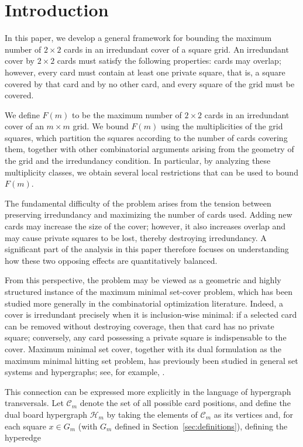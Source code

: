 \documentclass[11pt]{article}
\begin{document}
	\section{Introduction}\label{sec:Intro}
	
	In this paper, we develop a general framework for bounding the maximum number of
	\(2\times2\) cards in an irredundant cover of a square grid. An irredundant cover
	by \(2\times2\) cards must satisfy the following properties: cards may overlap;
	however, every card must contain at least one private square, that is, a square
	covered by that card and by no other card, and every square of the grid must be
	covered.
	
	We define \(F(m)\) to be the maximum number of \(2\times2\) cards in an
	irredundant cover of an \(m\times m\) grid. We bound \(F(m)\) using the
	multiplicities of the grid squares, which partition the squares according to
	the number of cards covering them, together with other combinatorial arguments
	arising from the geometry of the grid and the irredundancy condition.
	In particular, by analyzing these multiplicity classes, we obtain several local
	restrictions that can be used to bound \(F(m)\).
	
	The fundamental difficulty of the problem arises from the tension between
	preserving irredundancy and maximizing the number of cards used. Adding new
	cards may increase the size of the cover; however, it also increases overlap
	and may cause private squares to be lost, thereby destroying irredundancy.
	A significant part of the analysis in this paper therefore focuses on
	understanding how these two opposing effects are quantitatively balanced.
	
	From this perspective, the problem may be viewed as a geometric and highly
	structured instance of the maximum minimal set-cover problem, which has been
	studied more generally in the combinatorial optimization literature. Indeed,
	a cover is irredundant precisely when it is inclusion-wise minimal: if a
	selected card can be removed without destroying coverage, then that card has
	no private square; conversely, any card possessing a private square is
	indispensable to the cover. Maximum minimal set cover, together with its dual
	formulation as the maximum minimal hitting set problem, has previously been
	studied in general set systems and hypergraphs; see, for example,
	\cite{berge1989,eitergottlob1995,araujoetal2023,damascenoetal2026}.
	
	This connection can be expressed more explicitly in the language of hypergraph
	transversals. Let \(\mathcal C_m\) denote the set of all possible card
	positions, and define the dual board hypergraph \(\mathcal H_m\) by taking the
	elements of \(\mathcal C_m\) as its vertices and, for each square \(x\in G_m\) (with \(G_m\) defined in
	Section~\ref{sec:definitions}), defining the hyperedge
	
\end{document}
